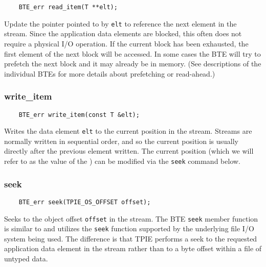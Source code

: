 \begin{lstlisting}
    BTE_err read_item(T **elt);
\end{lstlisting}

\noindent
Update the pointer pointed to by \lstinline|elt| to reference the next
element in the stream. Since the application data elements are
blocked, this often does not require a physical I/O operation. If the
current block has been exhausted, the first element of the next block
will be accessed. In some cases the BTE will try to prefetch the next
block and it may already be in memory. (See descriptions of the
individual BTEs for more details about prefetching or read-ahead.)

\vspace*{\baselineskip}
\subsubsection{write\_item}

\begin{lstlisting}
    BTE_err write_item(const T &elt);
\end{lstlisting}

\noindent
Writes the data element \lstinline|elt| to the current position in the
stream. Streams are normally written in sequential order, and so the
current position is usually directly after the previous element
written. The current position (which we will refer to as the value of
the ) can be modified via the \lstinline|seek|
command below.

\vspace*{\baselineskip}
\subsubsection{seek}

\begin{lstlisting}
    BTE_err seek(TPIE_OS_OFFSET offset);
\end{lstlisting}

\noindent
Seeks to the object offset \lstinline|offset| in the stream. The BTE
\lstinline|seek| member function is similar to and utilizes the
\lstinline|seek| function supported by the underlying file I/O system
being used. The difference is that TPIE performs a seek to the
requested application data element in the stream rather than to a byte
offset within a file of untyped data.

\vspace*{\baselineskip}
